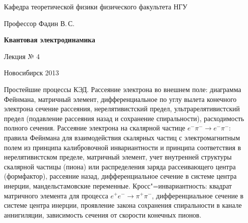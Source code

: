 \documentclass[12pt,pagesize,paper=landscape,paper=192mm:108mm]{scrbook}
\begin{document}
\begin{titlepage}
\begin{center}
    Кафедра теоретической физики физического факультета НГУ
    \medskip

    \Large
    Профессор Фадин В.\,С.
    \bigskip

    \huge
    \textbf{Квантовая электродинамика}
    \bigskip

    \Large
    Лекция № 4
    \vfill

    \normalsize
    \vfill

    \normalsize \ccbysa\hspace{0.5em}  Новосибирск 2013
  \end{center}
\end{titlepage}
\newpage

\vspace*{-1em}
\begin{center}
\vfill
  \begin{minipage}{0.75\linewidth}
    Простейшие процессы КЭД. Рассеяние электрона во внешнем поле:
    диаграмма Фейнмана, матричный элемент, дифференциальное по углу
    вылета конечного электрона сечение рассеяния, нерелятивистский
    предел, ультрарелятивистский предел (подавление рассеяния назад и
    сохранение спиральности), расходимость полного сечения. Рассеяние
    электрона на скалярной частице $e^-\pi^-\to e^-\pi^-$: правила
    Фейнмана для взаимодействия скалярных частиц с электромагнитным
    полем из принципа калибровочной инвариантности и принципа
    соответствия в нерелятивистском пределе, матричный элемент, учет
    внутренней структуры скалярной частицы (пиона) или распределения
    заряда рассеивающего центра (формфактор), рассеяние назад,
    дифференциальное сечение в системе центра инерции,
    мандельстамовские переменные. Кросс"=инвариантность: квадрат
    матричного элемента для процесса $e^+e^-\to\pi^+\pi^-$,
    дифференциальное сечение в системе центра инерции, проявление
    закона сохранения спиральности в канале аннигиляции, зависимость
    сечения от скорости конечных пионов.
  \end{minipage}
  \vfill

\end{center}
\end{document}
